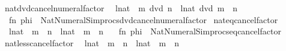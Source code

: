 \begin{isabellebody}
\isanewline
{}\isamarkupfalse%
\ nat{\isacharunderscore}{\kern0pt}dvd{\isacharunderscore}{\kern0pt}cancel{\isacharunderscore}{\kern0pt}numeral{\isacharunderscore}{\kern0pt}factor\isanewline
\ \ {\isacharparenleft}{\kern0pt}{\isachardoublequoteopen}{\isacharparenleft}{\kern0pt}{\isacharparenleft}{\kern0pt}l{\isacharcolon}{\kern0pt}{\isacharcolon}{\kern0pt}nat{\isacharparenright}{\kern0pt}\ {\isacharasterisk}{\kern0pt}\ m{\isacharparenright}{\kern0pt}\ dvd\ n{\isachardoublequoteclose}\ {\isacharbar}{\kern0pt}\ {\isachardoublequoteopen}{\isacharparenleft}{\kern0pt}l{\isacharcolon}{\kern0pt}{\isacharcolon}{\kern0pt}nat{\isacharparenright}{\kern0pt}\ dvd\ {\isacharparenleft}{\kern0pt}m\ {\isacharasterisk}{\kern0pt}\ n{\isacharparenright}{\kern0pt}{\isachardoublequoteclose}{\isacharparenright}{\kern0pt}\ {\isacharequal}{\kern0pt}\isanewline
\ \ {\isacartoucheopen}fn\ phi\ {\isacharequal}{\kern0pt}{\isachargreater}{\kern0pt}\ Nat{\isacharunderscore}{\kern0pt}Numeral{\isacharunderscore}{\kern0pt}Simprocs{\isachardot}{\kern0pt}dvd{\isacharunderscore}{\kern0pt}cancel{\isacharunderscore}{\kern0pt}numeral{\isacharunderscore}{\kern0pt}factor{\isacartoucheclose}\isanewline
\isanewline
{}\isamarkupfalse%
\ nat{\isacharunderscore}{\kern0pt}eq{\isacharunderscore}{\kern0pt}cancel{\isacharunderscore}{\kern0pt}factor\isanewline
\ \ {\isacharparenleft}{\kern0pt}{\isachardoublequoteopen}{\isacharparenleft}{\kern0pt}l{\isacharcolon}{\kern0pt}{\isacharcolon}{\kern0pt}nat{\isacharparenright}{\kern0pt}\ {\isacharasterisk}{\kern0pt}\ m\ {\isacharequal}{\kern0pt}\ n{\isachardoublequoteclose}\ {\isacharbar}{\kern0pt}\ {\isachardoublequoteopen}{\isacharparenleft}{\kern0pt}l{\isacharcolon}{\kern0pt}{\isacharcolon}{\kern0pt}nat{\isacharparenright}{\kern0pt}\ {\isacharequal}{\kern0pt}\ m\ {\isacharasterisk}{\kern0pt}\ n{\isachardoublequoteclose}{\isacharparenright}{\kern0pt}\ {\isacharequal}{\kern0pt}\isanewline
\ \ {\isacartoucheopen}fn\ phi\ {\isacharequal}{\kern0pt}{\isachargreater}{\kern0pt}\ Nat{\isacharunderscore}{\kern0pt}Numeral{\isacharunderscore}{\kern0pt}Simprocs{\isachardot}{\kern0pt}eq{\isacharunderscore}{\kern0pt}cancel{\isacharunderscore}{\kern0pt}factor{\isacartoucheclose}\isanewline
\isanewline
{}\isamarkupfalse%
\ nat{\isacharunderscore}{\kern0pt}less{\isacharunderscore}{\kern0pt}cancel{\isacharunderscore}{\kern0pt}factor\isanewline
\ \ {\isacharparenleft}{\kern0pt}{\isachardoublequoteopen}{\isacharparenleft}{\kern0pt}l{\isacharcolon}{\kern0pt}{\isacharcolon}{\kern0pt}nat{\isacharparenright}{\kern0pt}\ {\isacharasterisk}{\kern0pt}\ m\ {\isacharless}{\kern0pt}\ n{\isachardoublequoteclose}\ {\isacharbar}{\kern0pt}\ {\isachardoublequoteopen}{\isacharparenleft}{\kern0pt}l{\isacharcolon}{\kern0pt}{\isacharcolon}{\kern0pt}nat{\isacharparenright}{\kern0pt}\ {\isacharless}{\kern0pt}\ m\ {\isacharasterisk}{\kern0pt}\ n{\isachardoublequoteclose}{\isacharparenright}{\kern0pt}\ {\isacharequal}{\kern0pt}\isanewline

\end{isabellebody}
